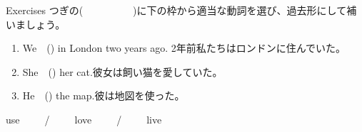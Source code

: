 \documentclass[aspectratio=169,xcolor={dvipsnames,table}]{beamer}
\newcommand{\myaudio}[1]{\href{#1}{\faVolumeUp}}
\begin{document}
\begin{frame}[plain]{Exercises}
つぎの(~~~~~~~~~~)に下の枠から適当な動詞を選び、過去形にして補いましょう。 

\begin{enumerate}
	\item We~~() in London two years ago.  2年前私たちはロンドンに住んでいた。       
 \item She~~() her cat.彼女は飼い猫を愛していた。
	\item He~~() the map.彼は地図を使った。
\end{enumerate}

\begin{tcolorbox}[title=この中から選んでください]
\centering
use~~~~~/~~~~~love~~~~~/~~~~~live
\end{tcolorbox}
\hfill\myaudio{./audio/025_past_do_07.mp3}
\end{frame}
\end{document}
